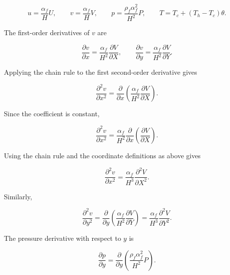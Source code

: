 \documentclass[preprint,3p,number]{elsarticle}
\begin{document}
\begin{equation}
u=\frac{\alpha_f}{H}U,
\qquad
v=\frac{\alpha_f}{H}V,
\qquad
p=\frac{\rho_f\alpha_f^2}{H^2}P,
\qquad
T=T_c+(T_h-T_c)\theta.
\label{eq:horizontal_variables}
\end{equation}

The first-order derivatives of \(v\) are

\begin{equation}
\frac{\partial v}{\partial x}
=
\frac{\alpha_f}{H^2}
\frac{\partial V}{\partial X},
\qquad
\frac{\partial v}{\partial y}
=
\frac{\alpha_f}{H^2}
\frac{\partial V}{\partial Y}.
\label{eq:vertical_first_derivatives}
\end{equation}

Applying the chain rule to the first second-order derivative gives

\begin{equation}
\frac{\partial^2v}{\partial x^2}
=
\frac{\partial}{\partial x}
\left(
\frac{\alpha_f}{H^2}
\frac{\partial V}{\partial X}
\right).
\end{equation}

Since the coefficient is constant,

\begin{equation}
\frac{\partial^2v}{\partial x^2}
=
\frac{\alpha_f}{H^2}
\frac{\partial}{\partial x}
\left(\frac{\partial V}{\partial X}\right).
\end{equation}

Using the chain rule and the coordinate definitions as above gives

\begin{equation}
\frac{\partial^2v}{\partial x^2}
=
\frac{\alpha_f}{H^3}
\frac{\partial^2V}{\partial X^2}.
\label{eq:d2v_dx2}
\end{equation}

Similarly,

\begin{equation}
\frac{\partial^2v}{\partial y^2}
=
\frac{\partial}{\partial y}
\left(
\frac{\alpha_f}{H^2}
\frac{\partial V}{\partial Y}
\right)
=
\frac{\alpha_f}{H^3}
\frac{\partial^2V}{\partial Y^2}.
\label{eq:d2v_dy2}
\end{equation}

The pressure derivative with respect to \(y\) is

\begin{equation}
\frac{\partial p}{\partial y}
=
\frac{\partial}{\partial y}
\left(
\frac{\rho_f\alpha_f^2}{H^2}P
\right).
\end{equation}
\end{document}
